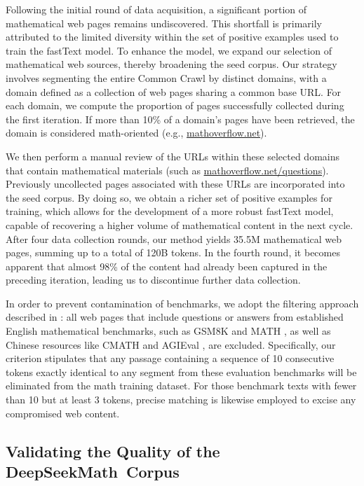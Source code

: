 \begin{itemize}[topsep=0pt]
Following the initial round of data acquisition, a significant portion of mathematical web pages remains undiscovered. This shortfall is primarily attributed to the limited diversity within the set of positive examples used to train the fastText model. To enhance the model, we expand our selection of mathematical web sources, thereby broadening the seed corpus. Our strategy involves segmenting the entire Common Crawl by distinct domains, with a domain defined as a collection of web pages sharing a common base URL. For each domain, we compute the proportion of pages successfully collected during the first iteration. If more than 10\% of a domain’s pages have been retrieved, the domain is considered math-oriented (e.g., \url{mathoverflow.net}).

We then perform a manual review of the URLs within these selected domains that contain mathematical materials (such as \url{mathoverflow.net/questions}). Previously uncollected pages associated with these URLs are incorporated into the seed corpus. By doing so, we obtain a richer set of positive examples for training, which allows for the development of a more robust fastText model, capable of recovering a higher volume of mathematical content in the next cycle. After four data collection rounds, our method yields 35.5M mathematical web pages, summing up to a total of 120B tokens. In the fourth round, it becomes apparent that almost 98\% of the content had already been captured in the preceding iteration, leading us to discontinue further data collection.

In order to prevent contamination of benchmarks, we adopt the filtering approach described in \cite{deepseek-coder}: all web pages that include questions or answers from established English mathematical benchmarks, such as GSM8K \citep{gsm8k} and MATH \citep{MATH}, as well as Chinese resources like CMATH \citep{wei2023cmath} and AGIEval \citep{agieval}, are excluded. Specifically, our criterion stipulates that any passage containing a sequence of 10 consecutive tokens exactly identical to any segment from these evaluation benchmarks will be eliminated from the math training dataset. For those benchmark texts with fewer than 10 but at least 3 tokens, precise matching is likewise employed to excise any compromised web content.

\subsection{Validating the Quality of the DeepSeekMath~Corpus}


\end{itemize}
